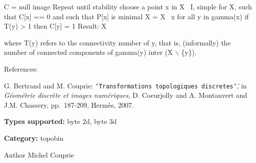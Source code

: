 \begin{DoxyVerb}
C = null image
Repeat until stability
  choose a point x in X \ I, simple for X, such that C[x] == 0 
    and such that P[x] is minimal
  X = X \ {x}
  for all y in gamma(x)
    if T(y) > 1 then C[y] = 1
Result: X
\end{DoxyVerb}


where T(y) refers to the connectivity number of y, that is, (informally) the number of connected components of gamma(y) inter (X $\backslash$ \{y\}).

References:\par
 [BC07] G. Bertrand and M. Couprie: {\tt \char`\"{}Transformations topologiques discretes\char`\"{}}, in {\itshape G\'{e}om\'{e}trie discr\`{e}te et images num\'{e}riques\/}, D. Coeurjolly and A. Montanvert and J.M. Chassery, pp.~187-\/209, Herm\`{e}s, 2007.\par


{\bfseries Types supported:} byte 2d, byte 3d

{\bfseries Category:} topobin

\begin{DoxyAuthor}{Author}
Michel Couprie 
\end{DoxyAuthor}
